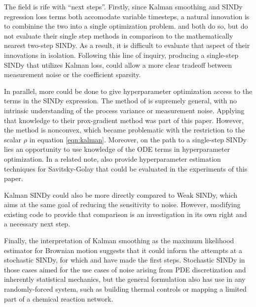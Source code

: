 \documentclass{article}
\begin{document}
The field is rife with ``next steps''.  Firstly, since Kalman smoothing and SINDy regression loss terms both accomodate variable timesteps, a natural innovation is to combinine the two into a single optimization problem.  \cite{Hirsh2022} and \cite{Rudy2019} both do so, but do not evaluate their single step methods in comparison to the mathematically nearest two-step SINDy.  As a result, it is difficult to evaluate that aspect of their innovations in isolation.  Following this line of inquiry, producing a single-step SINDy that utilizes Kalman loss, could allow a more clear tradeoff between measurement noise or the coefficient sparsity.

In parallel, more could be done to give hyperparameter optimization  access to the terms in the SINDy expression.  The method of \cite{Barratt2020} is supremely general, with no intrinsic understanding of the process variance or measurement noise.  Applying that knowledge to their prox-gradient method was part of this paper.  However, the method is nonconvex, which became problematic with the restriction to the scalar $\rho$ in equation \ref{eqn:kalman}.  Moreover, on the path to a single-step SINDy lies an opportunity to use knowledge of the ODE terms in hyperparameter optimization.  In a related note, \cite{VanBreugel2020} also provide hyperparameter estimation techniques for Savitsky-Golay that could be evaluated in the experiments of this paper.

Kalman SINDy could also be more directly compared to Weak SINDy, which aims at the same goal of reducing the sensitivity to noise.  However, modifying existing code to provide that comparison is an investigation in its own right and a necessary next step.

Finally, the interpretation of Kalman smoothing as the maximum likelihood estimator for Brownian motion suggests that it could inform the attempts at a stochastic SINDy, for which \cite{Callaham2021} and \cite{Boninsegna2018} have made the first steps.  Stochastic SINDy in those cases aimed for the use cases of noise arising from PDE discretization and inherently statistical mechanics, but the general formulation also has use in any randomly-forced system, such as building thermal controls or mapping a limited part of a chemical reaction network.
\end{document}
